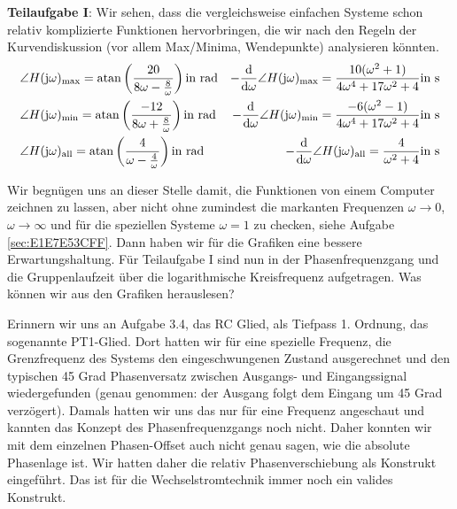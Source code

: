 \begin{Loesung}
\textbf{Teilaufgabe I}: Wir sehen, dass die vergleichsweise einfachen Systeme
schon relativ  komplizierte Funktionen hervorbringen, die wir nach den Regeln der
Kurvendiskussion (vor allem Max/Minima, Wendepunkte) analysieren könnten.
%
\begin{align}
&\angle H(\im\omega)_\mathrm{max} =
\mathrm{atan}\left(\frac{20}{8\omega-\frac{8}{\omega}}\right)\text{in rad}
&-\frac{\fsd}{\fsd \omega} \angle H(\im\omega)_\mathrm{max}=
\frac{10(\omega^2+1)}{4\omega^4+17\omega^2+4}\text{in s}
\\
&\angle H(\im\omega)_\mathrm{min} =
\mathrm{atan}\left(\frac{-12}{8\omega+\frac{8}{\omega}}\right)\text{in rad}
&-\frac{\fsd}{\fsd \omega} \angle H(\im\omega)_\mathrm{min}=
\frac{-6(\omega^2-1)}{4\omega^4+17\omega^2+4}\text{in s}
\\
&\angle H(\im\omega)_\mathrm{all} =
\mathrm{atan}\left(\frac{4}{\omega-\frac{4}{\omega}}\right)\text{in rad}
&-\frac{\fsd}{\fsd \omega} \angle H(\im\omega)_\mathrm{all}=
\frac{4}{\omega^2+4}\text{in s}
\end{align}
%

Wir begnügen uns an dieser Stelle damit, die Funktionen von einem Computer zeichnen
zu lassen, aber nicht ohne zumindest die markanten Frequenzen $\omega\to 0$,
$\omega\to \infty$ und für die speziellen Systeme $\omega = 1$ zu checken, siehe
Aufgabe \ref{sec:E1E7E53CFF}. Dann haben wir für die Grafiken eine
bessere Erwartungshaltung.
%
Für Teilaufgabe I sind nun in
 der Phasenfrequenzgang
und die Gruppenlaufzeit über die logarithmische Kreisfrequenz aufgetragen.
%
Was können wir aus den Grafiken herauslesen?

Erinnern wir uns an Aufgabe 3.4,
das RC Glied, als Tiefpass 1. Ordnung, das sogenannte PT1-Glied.
Dort hatten wir für eine spezielle Frequenz, die Grenzfrequenz des Systems
den eingeschwungenen Zustand ausgerechnet und den typischen 45 Grad Phasenversatz
zwischen Ausgangs- und Eingangssignal wiedergefunden (genau genommen: der Ausgang
folgt dem Eingang um 45 Grad verzögert). Damals hatten wir uns das nur für
eine Frequenz angeschaut und kannten das Konzept des Phasenfrequenzgangs noch
nicht. Daher konnten wir mit dem einzelnen Phasen-Offset auch nicht genau sagen,
wie die absolute Phasenlage ist. Wir hatten daher die relativ Phasenverschiebung
als Konstrukt eingeführt. Das ist für die Wechselstromtechnik immer noch
ein valides Konstrukt.


\end{Loesung}
